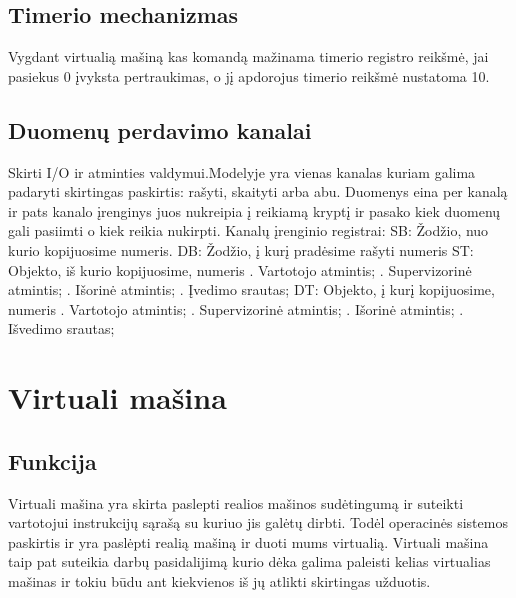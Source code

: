 \documentclass[oneside]{VUMIFPSkursinis}
\begin{document}
\subsection{Timerio mechanizmas}
Vygdant virtualią mašiną kas komandą mažinama timerio registro reikšmė, jai pasiekus 0 įvyksta pertraukimas, o jį apdorojus timerio reikšmė nustatoma 10.
\subsection{Duomenų perdavimo kanalai}
Skirti I/O ir atminties valdymui.Modelyje yra vienas kanalas kuriam galima padaryti skirtingas paskirtis: rašyti, skaityti arba abu. Duomenys eina per kanalą ir pats kanalo įrenginys juos nukreipia į reikiamą kryptį ir pasako kiek duomenų gali pasiimti o kiek reikia nukirpti. Kanalų įrenginio registrai:\newline
\newline SB: Žodžio, nuo kurio kopijuosime numeris.
\newline DB: Žodžio, į kurį pradėsime rašyti numeris
\newline ST: Objekto, iš kurio kopijuosime, numeris
. Vartotojo atmintis;
. Supervizorinė atmintis;
. Išorinė atmintis;
. Įvedimo srautas;
\newline DT: Objekto, į kurį kopijuosime, numeris
. Vartotojo atmintis;
. Supervizorinė atmintis;
. Išorinė atmintis;
. Išvedimo srautas; 


\section{Virtuali mašina}

\subsection{Funkcija}
Virtuali mašina yra skirta paslepti realios mašinos sudėtingumą ir suteikti vartotojui instrukcijų sąrašą su kuriuo jis galėtų dirbti. Todėl operacinės sistemos paskirtis ir yra paslėpti realią mašiną ir duoti mums virtualią. Virtuali mašina taip pat suteikia darbų pasidalijimą kurio dėka galima paleisti kelias virtualias mašinas ir tokiu būdu ant kiekvienos iš jų atlikti skirtingas užduotis.
\end{document}
